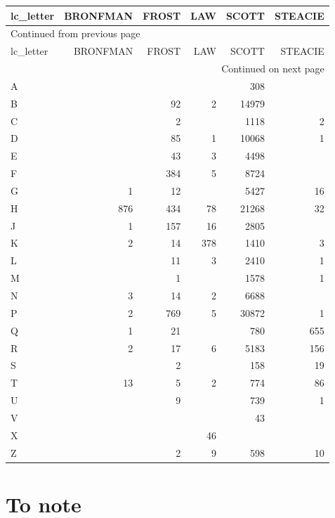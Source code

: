 \documentclass[11pt]{article}
\begin{document}
\begin{longtable}{lrrrrr}
lc\_letter & BRONFMAN & FROST & LAW & SCOTT & STEACIE\\
\hline
\endfirsthead
\multicolumn{6}{l}{Continued from previous page} \\
\hline

lc\_letter & BRONFMAN & FROST & LAW & SCOTT & STEACIE \\

\hline
\endhead
\hline\multicolumn{6}{r}{Continued on next page} \\
\endfoot
\endlastfoot
\hline
A &  &  &  & 308 & \\
B &  & 92 & 2 & 14979 & \\
C &  & 2 &  & 1118 & 2\\
D &  & 85 & 1 & 10068 & 1\\
E &  & 43 & 3 & 4498 & \\
F &  & 384 & 5 & 8724 & \\
G & 1 & 12 &  & 5427 & 16\\
H & 876 & 434 & 78 & 21268 & 32\\
J & 1 & 157 & 16 & 2805 & \\
K & 2 & 14 & 378 & 1410 & 3\\
L &  & 11 & 3 & 2410 & 1\\
M &  & 1 &  & 1578 & 1\\
N & 3 & 14 & 2 & 6688 & \\
P & 2 & 769 & 5 & 30872 & 1\\
Q & 1 & 21 &  & 780 & 655\\
R & 2 & 17 & 6 & 5183 & 156\\
S &  & 2 &  & 158 & 19\\
T & 13 & 5 & 2 & 774 & 86\\
U &  & 9 &  & 739 & 1\\
V &  &  &  & 43 & \\
X &  &  & 46 &  & \\
Z &  & 2 & 9 & 598 & 10\\
\end{longtable}


\section*{To note}
\label{sec:org327e8bd}
\end{document}
